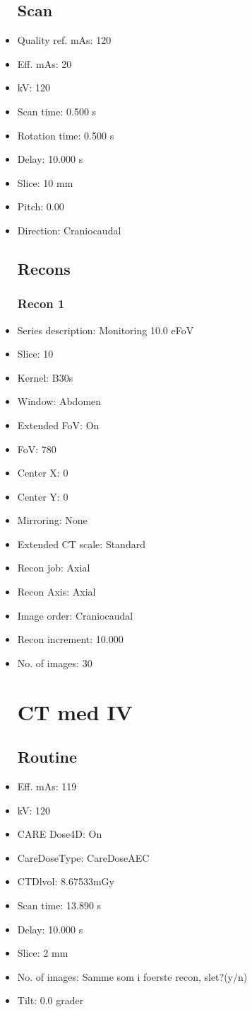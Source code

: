 \documentclass[12pt]{article}
\begin{document}
\begin{itemize}
\subsection{Scan}
\item Quality ref. mAs: 120\item Eff. mAs: 20\item kV: 120\item Scan time: 0.500 s\item Rotation time: 0.500 s\item Delay: 10.000 s\item Slice: 10 mm\item Pitch: 0.00\item Direction: Craniocaudal\subsection{Recons}

\subsubsection{Recon 1}
\item Series description: Monitoring 10.0 eFoV
\item Slice: 10
\item Kernel: B30s
\item Window: Abdomen
\item Extended FoV: On
\item FoV: 780
\item Center X: 0
\item Center Y: 0
\item Mirroring: None
\item Extended CT scale: Standard
\item Recon job: Axial
\item Recon Axis: Axial
\item Image order: Craniocaudal
\item Recon increment: 10.000
\item No. of images: 30
\section{CT med IV}
\subsection{Routine}
\item Eff. mAs: 119\item kV: 120\item CARE Dose4D: On\item CareDoseType: CareDoseAEC\item CTDlvol: 8.67533mGy\item Scan time: 13.890 s\item Delay: 10.000 s\item Slice: 2 mm\item No. of images: Samme som i foerste recon, slet?(y/n)\item Tilt: 0.0 grader

\end{itemize}
\end{document}
